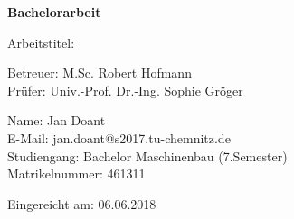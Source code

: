 \begin{titlepage}
	
	\vspace*{1cm}
		
		\begin{center}	
		
		\vspace{1.5cm}
		
		{\huge\textbf{Bachelorarbeit}}
		
		\vspace{1.5cm}
		
		{\large Arbeitstitel:}\\
		{\large\textbf{\mytitle}}
		
		\vspace{1.5cm}
		
		Betreuer: M.Sc. Robert Hofmann\\
		Prüfer: Univ.-Prof. Dr.-Ing. Sophie Gröger		
		
		\vfill
		
			
		
	\end{center}
	
	\begin{flushleft}
		Name: Jan Doant\\		
		E-Mail: jan.doant@s2017.tu-chemnitz.de\\
		Studiengang: Bachelor Maschinenbau (7.Semester)\\
		Matrikelnummer: 461311\linebreak
		
		
		Eingereicht am: 06.06.2018
		
	\end{flushleft}
	
	
\end{titlepage}